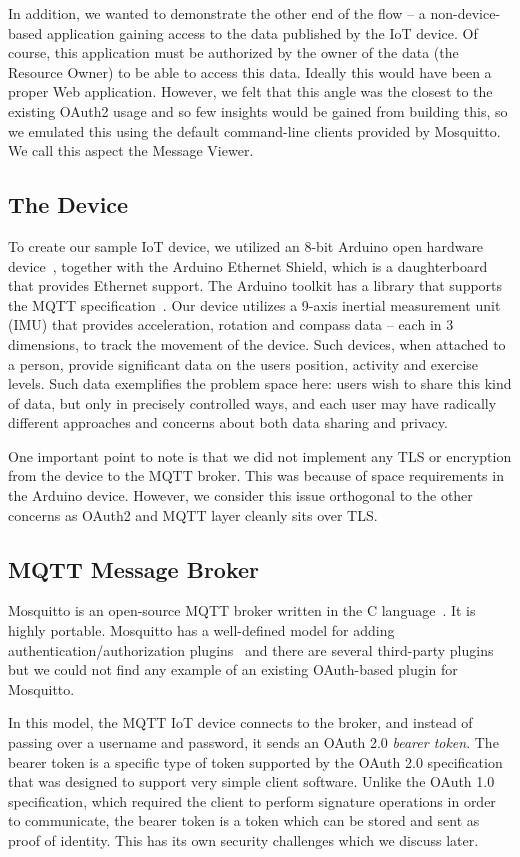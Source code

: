 \documentclass{IEEEtran}
\newif\iflong
\begin{document}
In addition, we wanted to demonstrate the other end of the flow -- a non-device-based application gaining 
access to the data published by the IoT device. Of course, this application must be 
authorized by the owner of the data (the Resource Owner) to be able to access this data. Ideally this
would have been a proper Web application. However, we felt that this angle was the closest to the existing 
OAuth2 usage and so few insights would be gained from building this, so we emulated
this using the default command-line clients provided by Mosquitto. We call this aspect the Message Viewer.

\subsection{The Device}
To create our sample IoT device, we utilized an 8-bit Arduino open hardware device~\cite{arduino}, together
with the Arduino Ethernet Shield, which is a daughterboard that provides Ethernet support. 
The Arduino toolkit has a library that supports the MQTT specification~\cite{pubsubclient}.
Our device utilizes a 9-axis inertial measurement unit (IMU) that provides acceleration, rotation and
compass data -- each in 3 dimensions, to track the movement of the device. Such devices, when 
attached to a person, provide significant data on the users position, activity and exercise levels. Such
data exemplifies the problem space here: users wish to share this kind of data, but only in precisely 
controlled ways, and each user may have radically different approaches and concerns about both
data sharing and privacy. 

One important point to note is that we did not implement any TLS or encryption from the device to the MQTT broker. This was because of space requirements in the Arduino device. However, we consider this issue orthogonal to the other concerns as OAuth2 and MQTT layer cleanly sits over TLS.

\subsection{MQTT Message Broker}
Mosquitto is an open-source MQTT broker written in the C language~\cite{mosquitto}. It is highly portable. Mosquitto has a well-defined model for
adding authentication/authorization plugins~\cite{mosquitto-auth} and there are several third-party
plugins but we could not find any 
example of an existing OAuth-based plugin for Mosquitto. 

In this model, the MQTT IoT device connects to the broker, and instead of passing over a username 
and password, it sends an OAuth 2.0 \emph{bearer token}. 
The bearer token is a specific type of 
token supported by the OAuth 2.0 specification that was designed to support very simple client 
software. Unlike the OAuth 1.0 specification, which required the client to perform signature 
operations in order to communicate, the bearer token is a token which can be stored and sent
as proof of identity. This has its own security challenges which we discuss later.
\end{document}
